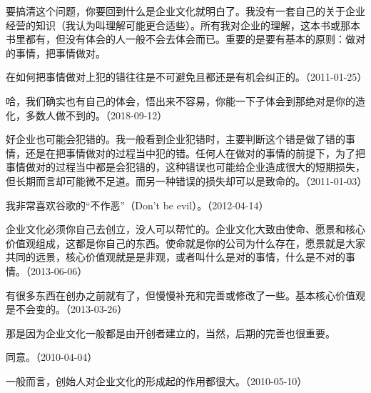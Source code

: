 
要搞清这个问题，你要回到什么是企业文化就明白了。我没有一套自己的关于企业经营的知识（我认为叫理解可能更合适些）。所有我对企业的理解，这本书或那本书里都有，但没有体会的人一般不会去体会而已。重要的是要有基本的原则：做对的事情，把事情做对。

在如何把事情做对上犯的错往往是不可避免且都还是有机会纠正的。（2011-01-25）


哈，我们确实也有自己的体会，悟出来不容易，你能一下子体会到那绝对是你的造化，多数人做不到的。（2018-09-12）

好企业也可能会犯错的。我一般看到企业犯错时，主要判断这个错是做了错的事情，还是在把事情做对的过程当中犯的错。任何人在做对的事情的前提下，为了把事情做对的过程当中都是会犯错的，这种错误也可能给企业造成很大的短期损失，但长期而言却可能微不足道。而另一种错误的损失却可以是致命的。（2011-01-03）

我非常喜欢谷歌的“不作恶”（Don't be evil）。（2012-04-14）


企业文化必须你自己去创立，没人可以帮忙的。企业文化大致由使命、愿景和核心价值观组成，这都是你自己的东西。使命就是你的公司为什么存在，愿景就是大家共同的远景，核心价值观就是是非观，或者叫什么是对的事情，什么是不对的事情。（2013-06-06）


有很多东西在创办之前就有了，但慢慢补充和完善或修改了一些。基本核心价值观是不会变的。（2013-03-26）


那是因为企业文化一般都是由开创者建立的，当然，后期的完善也很重要。


同意。（2010-04-04）


一般而言，创始人对企业文化的形成起的作用都很大。（2010-05-10）

